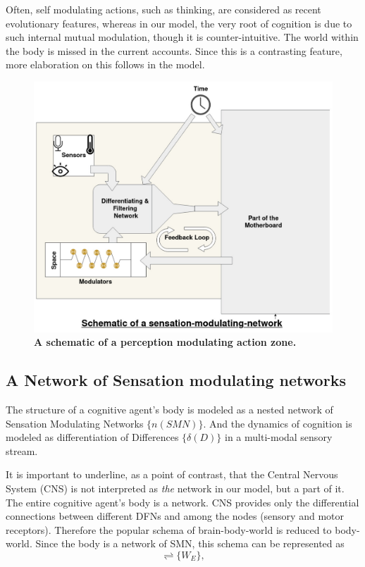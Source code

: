 Often, self modulating actions, such as thinking, are considered as recent evolutionary features, whereas in our model, the very root of cognition is due to such internal mutual modulation, though it is counter-intuitive. The world within the body is missed in the current accounts. Since this is a contrasting feature, more elaboration on this follows in the model. 

\begin{figure}[ht] 
\includegraphics[width=\textwidth]{graphics/structure-of-Zone.pdf}
\caption{\textbf{A schematic of a perception modulating action zone.}}
\label{zone}
\end{figure}

\subsection{A Network of Sensation modulating networks}

The structure of a cognitive agent's body is modeled as a nested network of Sensation Modulating Networks $\{n(SMN)\}$. And the dynamics of cognition is modeled as differentiation of Differences $\{\delta(D)\}$ in a  multi-modal sensory stream.

It is important to underline, as a point of contrast, that the Central Nervous System (CNS) is not interpreted as \textit{the} network in our model, but a part of it. The entire cognitive agent's body is a network. CNS provides only the differential connections between different DFNs and among the nodes (sensory and motor receptors). Therefore the popular schema of brain-body-world is reduced to body-world. Since the body is a network of SMN, this schema can be represented as 
\begin{equation}
[\{n(SMN)\} \rightleftharpoons \{W_I\}] \rightleftharpoons \{W_E\},
\end{equation}

